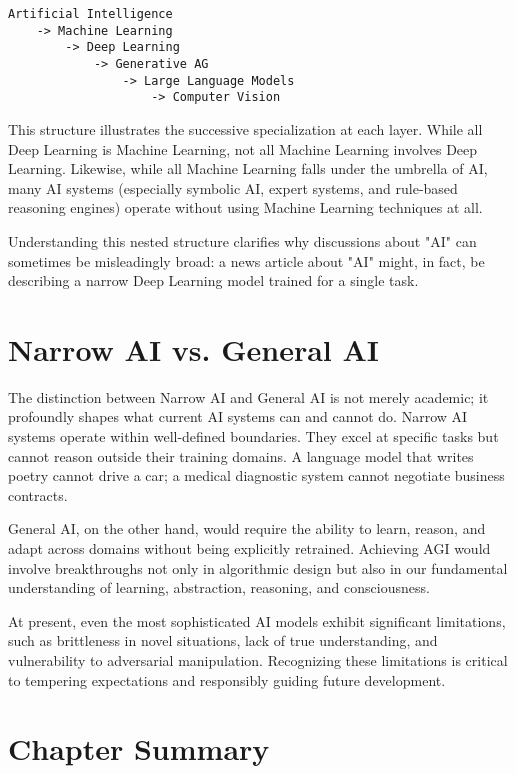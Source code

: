 \documentclass[openany]{book}
\begin{document}
\begin{verbatim}
Artificial Intelligence
    -> Machine Learning
        -> Deep Learning
            -> Generative AG
                -> Large Language Models
                    -> Computer Vision
\end{verbatim}

This structure illustrates the successive specialization at each layer. 
While all Deep Learning is Machine Learning, not all Machine Learning involves 
Deep Learning. Likewise, while all Machine Learning falls under the umbrella of 
AI, many AI systems (especially symbolic AI, expert systems, and rule-based 
reasoning engines) operate without using Machine Learning techniques at all.

Understanding this nested structure clarifies why discussions about "AI" can 
sometimes be misleadingly broad: a news article about "AI" might, in fact, be 
describing a narrow Deep Learning model trained for a single task.

\section{Narrow AI vs. General AI}

The distinction between Narrow AI and General AI is not merely academic; it 
profoundly shapes what current AI systems can and cannot do. Narrow AI systems 
operate within well-defined boundaries. They excel at specific tasks but cannot 
reason outside their training domains. A language model that writes poetry 
cannot drive a car; a medical diagnostic system cannot negotiate business 
contracts.

General AI, on the other hand, would require the ability to learn, reason, and 
adapt across domains without being explicitly retrained. Achieving AGI would 
involve breakthroughs not only in algorithmic design but also in our fundamental 
understanding of learning, abstraction, reasoning, and consciousness.

At present, even the most sophisticated AI models exhibit significant 
limitations, such as brittleness in novel situations, lack of true 
understanding, and vulnerability to adversarial manipulation. Recognizing these 
limitations is critical to tempering expectations and responsibly guiding 
future development.

\section{Chapter Summary}
\end{document}
